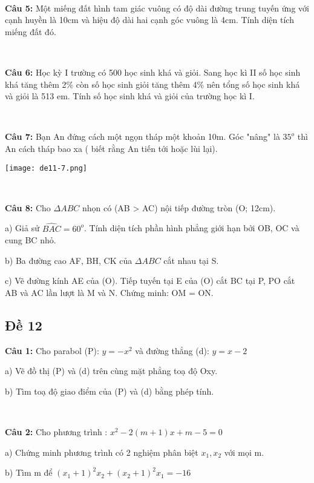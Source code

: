 \documentclass[12pt]{article}
\begin{document}
\    

\textbf{Câu 5:} Một miếng đất hình tam giác vuông có độ dài đường trung tuyến ứng với cạnh huyền là 10cm và hiệu độ dài hai cạnh góc vuông là 4cm. Tính diện tích miếng đất đó.\par

\    

\textbf{Câu 6:} Học kỳ I trường có 500 học sinh khá và giỏi. Sang học kì II số học sinh khá tăng thêm 2\% còn số học sinh giỏi tăng thêm 4\%  nên tổng số học sinh khá và giỏi là 513 em. Tính số học sinh khá và giỏi của trường học kì I. \par

\   

\textbf{Câu 7:} Bạn An đứng cách một ngọn tháp một khoản 10m. Góc "nâng" là $35^o$ thì An cách tháp bao xa ( biết rằng An tiến tới hoặc lùi lại).

\begin{center}
    \texttt{[image: de11-7.png]}
\end{center}

\   

\textbf{Câu 8:} Cho $\Delta ABC$ nhọn có (AB > AC) nội tiếp đường tròn (O; 12cm). \par
a) Giả sử $\widehat{BAC} = 60^o$. Tính diện tích phần hình phẳng giới hạn bởi OB, OC và cung BC nhỏ. \par
b) Ba đường cao AF, BH, CK của $\Delta ABC$ cắt nhau tại S. \par
c) Vẽ đường kính AE của (O). Tiếp tuyến tại E của (O) cắt BC tại P, PO cắt AB và AC lần lượt là M và N. Chứng minh: OM = ON.

\break

\subsection{Đề 12}

\textbf{Câu 1:} Cho parabol (P): $y = -x^2$ và đường thẳng (d): $y = x - 2$ \par
a) Vẽ đồ thị (P) và (d) trên cùng mặt phẳng toạ độ Oxy. \par
b) Tìm toạ độ giao điểm của (P) và (d) bằng phép tính. \par

\   

\textbf{Câu 2:} Cho phương trình : $x^2 - 2(m + 1)x + m - 5 = 0$ \par
a) Chứng minh phương trình có 2 nghiệm phân biệt $x_1, x_2$ với mọi m. \par
b) Tìm m để $(x_1 + 1)^2x_2 + (x_2 + 1)^2x_1 = -16$ \par
\end{document}

